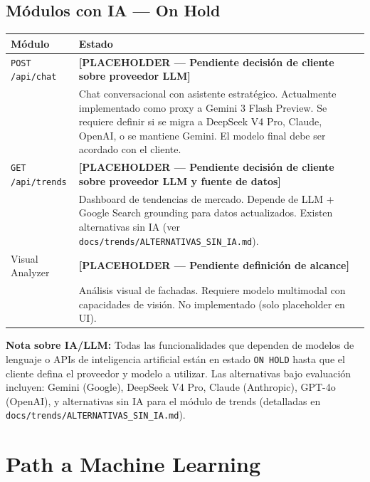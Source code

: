 \documentclass[11pt,a4paper]{article}
\begin{document}
\subsection{Módulos con IA — On Hold}
\begin{table}[H]
    \centering
    \renewcommand{\arraystretch}{1.2}
    \begin{tabularx}{\textwidth}{>{\hsize=0.25\hsize}X >{\hsize=0.75\hsize}X}
        \toprule
        \textbf{Módulo} & \textbf{Estado} \\
        \midrule
        \texttt{POST /api/chat} & \textbf{[PLACEHOLDER — Pendiente decisión de cliente sobre proveedor LLM]} \\
        & Chat conversacional con asistente estratégico. Actualmente implementado como proxy a Gemini 3 Flash Preview. Se requiere definir si se migra a DeepSeek V4 Pro, Claude, OpenAI, o se mantiene Gemini. El modelo final debe ser acordado con el cliente. \\
        \addlinespace
        \texttt{GET /api/trends} & \textbf{[PLACEHOLDER — Pendiente decisión de cliente sobre proveedor LLM y fuente de datos]} \\
        & Dashboard de tendencias de mercado. Depende de LLM + Google Search grounding para datos actualizados. Existen alternativas sin IA (ver \texttt{docs/trends/ALTERNATIVAS\_SIN\_IA.md}). \\
        \addlinespace
        Visual Analyzer & \textbf{[PLACEHOLDER — Pendiente definición de alcance]} \\
        & Análisis visual de fachadas. Requiere modelo multimodal con capacidades de visión. No implementado (solo placeholder en UI). \\
        \bottomrule
    \end{tabularx}
\end{table}

\textbf{Nota sobre IA/LLM:} Todas las funcionalidades que dependen de modelos de lenguaje o APIs de inteligencia artificial están en estado \texttt{ON HOLD} hasta que el cliente defina el proveedor y modelo a utilizar. Las alternativas bajo evaluación incluyen: Gemini (Google), DeepSeek V4 Pro, Claude (Anthropic), GPT-4o (OpenAI), y alternativas sin IA para el módulo de trends (detalladas en \texttt{docs/trends/ALTERNATIVAS\_SIN\_IA.md}).

\section{Path a Machine Learning}
\end{document}
